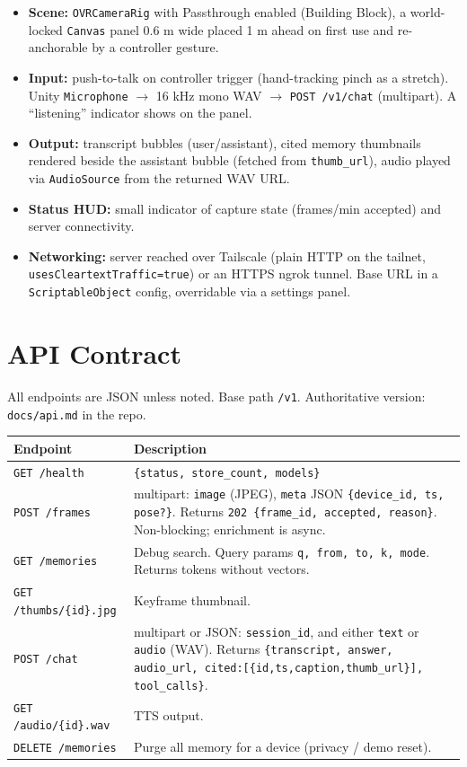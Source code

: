 \documentclass[11pt,a4paper]{article}
\begin{document}
\begin{itemize}
  \item \textbf{Scene:} \texttt{OVRCameraRig} with Passthrough enabled (Building Block), a world-locked \texttt{Canvas} panel 0.6 m wide placed 1 m ahead on first use and re-anchorable by a controller gesture.
  \item \textbf{Input:} push-to-talk on controller trigger (hand-tracking pinch as a stretch). Unity \texttt{Microphone} $\rightarrow$ 16 kHz mono WAV $\rightarrow$ \texttt{POST /v1/chat} (multipart). A ``listening'' indicator shows on the panel.
  \item \textbf{Output:} transcript bubbles (user/assistant), cited memory thumbnails rendered beside the assistant bubble (fetched from \texttt{thumb\_url}), audio played via \texttt{AudioSource} from the returned WAV URL.
  \item \textbf{Status HUD:} small indicator of capture state (frames/min accepted) and server connectivity.
  \item \textbf{Networking:} server reached over Tailscale (plain HTTP on the tailnet, \texttt{usesCleartextTraffic=true}) or an HTTPS ngrok tunnel. Base URL in a \texttt{ScriptableObject} config, overridable via a settings panel.
\end{itemize}

\section{API Contract}
All endpoints are JSON unless noted. Base path \texttt{/v1}. Authoritative version: \texttt{docs/api.md} in the repo.

\begin{longtable}{P{0.27\textwidth}P{0.68\textwidth}}
\toprule
\textbf{Endpoint} & \textbf{Description} \\
\midrule
\endhead
\texttt{GET /health} & \texttt{\{status, store\_count, models\}} \\
\texttt{POST /frames} & multipart: \texttt{image} (JPEG), \texttt{meta} JSON \texttt{\{device\_id, ts, pose?\}}. Returns \texttt{202 \{frame\_id, accepted, reason\}}. Non-blocking; enrichment is async. \\
\texttt{GET /memories} & Debug search. Query params \texttt{q, from, to, k, mode}. Returns tokens without vectors. \\
\texttt{GET /thumbs/\{id\}.jpg} & Keyframe thumbnail. \\
\texttt{POST /chat} & multipart or JSON: \texttt{session\_id}, and either \texttt{text} or \texttt{audio} (WAV). Returns \texttt{\{transcript, answer, audio\_url, cited:[\{id,ts,caption,thumb\_url\}], tool\_calls\}}. \\
\texttt{GET /audio/\{id\}.wav} & TTS output. \\
\texttt{DELETE /memories} & Purge all memory for a device (privacy / demo reset). \\
\bottomrule
\end{longtable}
\end{document}
